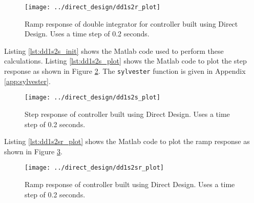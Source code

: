 \documentclass{article}
\newcommand{\sincludepdf}[2][]{
	
}
\begin{document}


\begin{figure}
\begin{center}
\texttt{[image: ../direct\_design/dd1s2r\_plot]}
\end{center}
\caption{Ramp response of double integrator for controller built
using Direct Design. Uses a time step of 0.2 seconds.}
\label{fig:dd1s2r_plot}
\end{figure}


\sincludepdf[pages=3,
			pagecommand=\subsection*{Example 2}
	]{scan/11251301.pdf}
\sincludepdf[pages=4-6]{scan/11251301.pdf}

Listing \ref{lst:dd1s2s_init} shows the Matlab code used to perform
these calculations.
Listing \ref{lst:dd1s2s_plot} shows the Matlab code to plot the step response
as shown in Figure \ref{fig:dd1s2s_plot}.
The \verb+sylvester+ function is given in Appendix \ref{app:sylvester}.



\clearpage


\begin{figure}
\begin{center}
\texttt{[image: ../direct\_design/dd1s2s\_plot]}
\end{center}
\caption{Step response of controller built
using Direct Design. Uses a time step of 0.2 seconds.}
\label{fig:dd1s2s_plot}
\end{figure}

\clearpage
Listing \ref{lst:dd1s2sr_plot} shows the Matlab code to plot the ramp response
as shown in Figure \ref{fig:dd1s2sr_plot}.



\begin{figure}
\begin{center}
\texttt{[image: ../direct\_design/dd1s2sr\_plot]}
\end{center}
\caption{Ramp response of controller built
using Direct Design. Uses a time step of 0.2 seconds.}
\label{fig:dd1s2sr_plot}
\end{figure}
\end{document}
